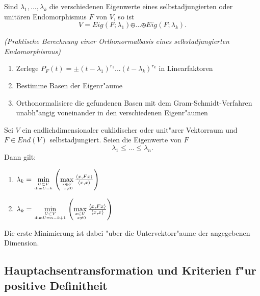 \documentclass[11pt, a4paper]{article}
\begin{document}
\begin{corollary}
Sind \(\lambda_{1}, ..., \lambda_{k}\) die verschiedenen Eigenwerte eines selbstadjungierten oder unitären Endomorphismus \(F\) von \(V\), so ist
$$
V= Eig (F ; \lambda_{1}) \obot ... \obot Eig(F ; \lambda_{k}).
$$
\end{corollary}

\begin{remark} \textit{(Praktische Berechnung einer Orthonormalbasis eines selbstadjungierten Endomorphismus)}
\begin{enumerate}
\item Zerlege $P_F(t) = \pm (t- \lambda_1)^{r_1} ... (t- \lambda_k)^{r_k} $ in Linearfaktoren
\item Bestimme Basen der Eigenr"aume
\item Orthonormalisiere die gefundenen Basen mit dem Gram-Schmidt-Verfahren unabh"angig voneinander in den verschiedenen Eigenr"aumen
\end{enumerate}

\end{remark}

\begin{theorem} Sei $V$ ein endlichdimensionaler euklidischer oder unit"arer Vektorraum und $F \in End(V)$ selbstadjungiert. Seien die Eigenwerte von $F$ 
$$
\lambda_1 \leq ... \leq \lambda_n.
$$
Dann gilt:
\begin{enumerate}
\item $\lambda_k = \min\limits_{U\subset V \atop \mathrm{dim} U = k} \left(   \max\limits_{x\in U \atop \ x \neq 0} \frac{\left\langle {x} , {Fx} \right\rangle}{\left\langle {x} , {x} \right\rangle}\right)$
\item $\lambda_k = \min\limits_{U\subset V \atop \mathrm{dim} U = n - k + 1} \left(   \max\limits_{x\in U \atop \ x \neq 0} \frac{\left\langle {x} , {Fx} \right\rangle}{\left\langle {x} , {x} \right\rangle}\right)$
\end{enumerate}
Die erste Minimierung ist dabei "uber die Untervektorr"aume der angegebenen Dimension.
\end{theorem}
 
\subsection{Hauptachsentransformation und Kriterien f"ur positive Definitheit}
\end{document}
